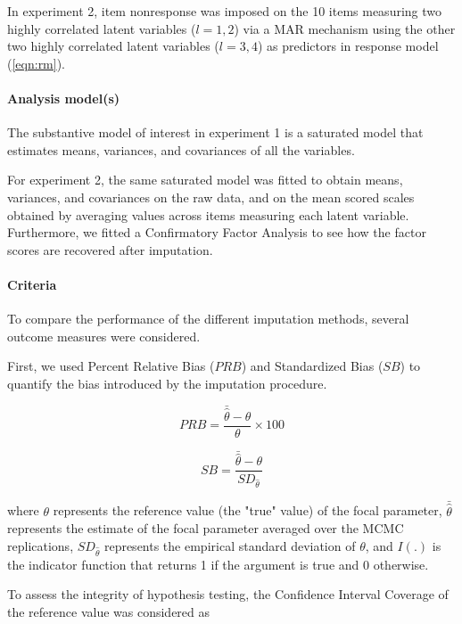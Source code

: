 	In experiment 2, item nonresponse was imposed on the 10 items measuring two highly correlated latent
	variables ($l = 1, 2$) via a MAR mechanism using the other two highly correlated latent variables ($l = 3, 4$) as 
	predictors in response model (\ref{eqn:rm}).

\paragraph{Analysis model(s)}

	The substantive model of interest in experiment 1 is a saturated model that estimates means,
	variances, and covariances of all the variables.

	For experiment 2, the same saturated model was fitted to obtain means, variances, and covariances on the raw
	data, and on the mean scored scales obtained by averaging values across items measuring each latent variable.
	Furthermore, we fitted a Confirmatory Factor Analysis to see how the factor scores are recovered after
	imputation.

\paragraph{Criteria}
	To compare the performance of the different imputation methods, several outcome measures were considered.

	First, we used Percent Relative Bias ($PRB$) and Standardized Bias ($SB$) to quantify the bias introduced by the imputation
	procedure.

	\begin{equation} \label{eqn:prb}
		PRB = \frac{\bar{\hat{\theta}} - \theta}{\theta} \times 100
	\end{equation}

	\begin{equation} \label{eqn:sb}
		SB =  \frac{\bar{\hat{\theta}} - \theta}{SD_{\hat{\theta}}}
	\end{equation}
	
	where $\theta$ represents the reference value (the "true" value) of the focal parameter, $\bar{\hat{\theta}}$
	represents the estimate of the focal parameter averaged over the MCMC replications, $SD_{\hat{\theta}}$
	represents the empirical standard deviation of $\theta$, and $I(.)$ is the indicator function that returns 1
	if the argument is true and 0 otherwise. 

	To assess the integrity of hypothesis testing, the Confidence Interval Coverage of the reference value
	was considered as

